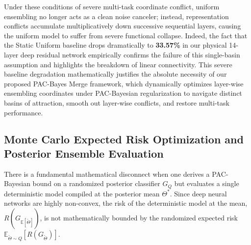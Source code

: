 Under these conditions of severe multi-task coordinate conflict, uniform ensembling no longer acts as a clean noise canceler; instead, representation conflicts accumulate multiplicatively down successive sequential layers, causing the uniform model to suffer from severe functional collapse. Indeed, the fact that the Static Uniform baseline drops dramatically to \textbf{33.57\%} in our physical 14-layer deep residual network empirically confirms the failure of this single-basin assumption and highlights the breakdown of linear connectivity. This severe baseline degradation mathematically justifies the absolute necessity of our proposed PAC-Bayes Merge framework, which dynamically optimizes layer-wise ensembling coordinates under PAC-Bayesian regularization to navigate distinct basins of attraction, smooth out layer-wise conflicts, and restore multi-task performance.

\subsection{Monte Carlo Expected Risk Optimization and Posterior Ensemble Evaluation}
\label{subsec:monte_carlo}
There is a fundamental mathematical disconnect when one derives a PAC-Bayesian bound on a randomized posterior classifier $G_Q$ but evaluates a single deterministic model compiled at the posterior mean $\Theta^*$. Since deep neural networks are highly non-convex, the risk of the deterministic model at the mean, $R(G_{\mathbb{E}[\tilde{\Theta}]})$, is not mathematically bounded by the randomized expected risk $\mathbb{E}_{\tilde{\Theta} \sim Q}[R(G_{\tilde{\Theta}})]$.

